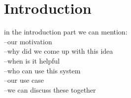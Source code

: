 \section{Introduction}
\label{sec:introduction}

in the introduction part we can mention:\\
--our motivation\\
--why did we come up with this idea\\
--when is it helpful\\
--who can use this system\\
--our use case\\
--we can discuss these together
